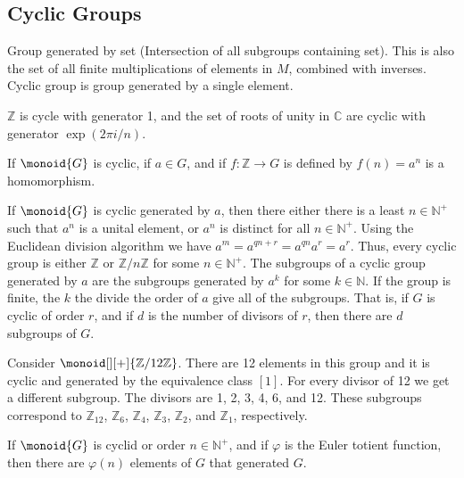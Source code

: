 \documentclass{book}                                                           %
\begin{document}
        \subsection{Cyclic Groups}
            Group generated by set (Intersection of all subgroups
            containing set). This is also the set of all finite
            multiplications of elements in $M$, combined with inverses.
            Cyclic group is group generated by a single element.
            \begin{example}
                $\mathbb{Z}$ is cycle with generator 1, and the set of roots
                of unity in $\mathbb{C}$ are cyclic with generator
                $\exp(2\pi{i}/n)$.
            \end{example}
            \begin{theorem}
                If $\monoid{G}$ is cyclic, if $a\in{G}$, and if
                $f:\mathbb{Z}\rightarrow{G}$ is defined by $f(n)=a^{n}$ is
                a homomorphism.
            \end{theorem}
            If $\monoid{G}$ is cyclic generated by $a$, then there either
            there is a least $n\in\mathbb{N}^{+}$ such that $a^{n}$ is a
            unital element, or $a^{n}$ is distinct for all
            $n\in\mathbb{N}^{+}$. Using the Euclidean division algorithm we
            have $a^{m}=a^{qn+r}=a^{qn}a^{r}=a^{r}$. Thus, every cyclic
            group is either $\mathbb{Z}$ or $\mathbb{Z}/n\mathbb{Z}$ for
            some $n\in\mathbb{N}^{+}$. The subgroups of a cyclic group
            generated by $a$ are the subgroups generated by $a^{k}$ for some
            $k\in\mathbb{N}$. If the group is finite, the $k$ the divide
            the order of $a$ give all of the subgroups. That is, if
            $G$ is cyclic of order $r$, and if $d$ is the number of divisors
            of $r$, then there are $d$ subgroups of $G$.
            \begin{example}
                Consider $\monoid[][+]{\mathbb{Z}/12\mathbb{Z}}$. There are
                12 elements in this group and it is cyclic and generated by
                the equivalence class $[1]$. For every divisor of 12 we get
                a different subgroup. The divisors are 1, 2, 3, 4, 6, and
                12. These subgroups correspond to $\mathbb{Z}_{12}$,
                $\mathbb{Z}_{6}$, $\mathbb{Z}_{4}$, $\mathbb{Z}_{3}$,
                $\mathbb{Z}_{2}$, and $\mathbb{Z}_{1}$, respectively.
            \end{example}
            \begin{theorem}
                If $\monoid{G}$ is cyclid or order $n\in\mathbb{N}^{+}$, and
                if $\varphi$ is the Euler totient function, then there are
                $\varphi(n)$ elements of $G$ that generated $G$.
            \end{theorem}
\end{document}
